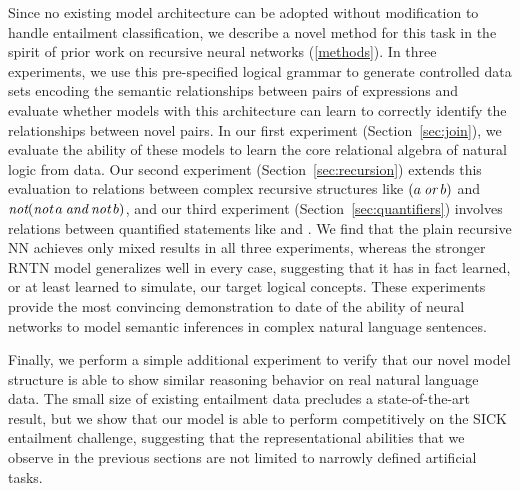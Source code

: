  
Since no existing model architecture can be adopted without modification
to handle entailment classification, we describe a novel method for this task
in the spirit of prior work on recursive neural networks (\ref{methods}).
In three experiments, we use this pre-specified logical grammar to
generate controlled data sets encoding the semantic relationships
between pairs of expressions and evaluate whether models with this architecture can 
learn to correctly identify the relationships between novel pairs.
In our first experiment (Section~\ref{sec:join}), we
evaluate the ability of these models to learn the core relational
algebra of natural logic from data. Our second experiment
(Section~\ref{sec:recursion}) extends this evaluation to relations
between complex recursive structures like $(a \mathbin{\textit{or}} b)$ and
$\mathop{\textit{not}} (\mathop{\textit{not}} a \mathbin{\textit{and}} \mathop{\textit{not}} b)$, and our third experiment
(Section~\ref{sec:quantifiers}) involves relations between quantified
statements like  and .
We find that the plain recursive NN achieves only mixed results in all three
experiments, whereas the stronger RNTN model generalizes well in every
case, suggesting that it has in fact learned, or at least learned to
simulate, our target logical concepts. These experiments provide the 
most convincing demonstration to date of the ability of neural networks to model
semantic inferences in complex natural language sentences.

Finally, we perform a simple additional experiment to verify that our novel
model structure is able to show similar reasoning behavior on real natural language data.
The small size of existing entailment data precludes a state-of-the-art result, but we show
that our model is able to perform competitively on the SICK entailment challenge, suggesting
that the representational abilities that we observe in the previous sections are not limited to 
narrowly defined artificial tasks.

